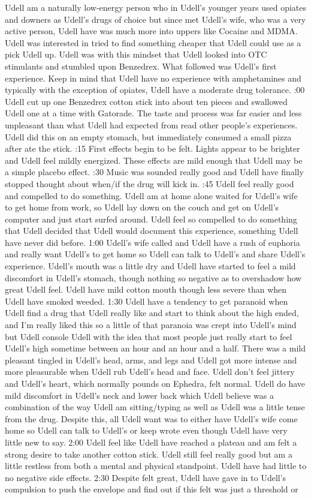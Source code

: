 \documentclass[12pt]{book}
\begin{document}
Udell am a naturally low-energy person who in Udell's younger years used opiates and downers as Udell's drugs of choice but since met Udell's wife, who was a very active person, Udell have was much more into uppers like Cocaine and MDMA. Udell was interested in tried to find something cheaper that Udell could use as a pick Udell up. Udell was with this mindset that Udell looked into OTC stimulants and stumbled upon Benzedrex. What followed was Udell's first experience. Keep in mind that Udell have no experience with amphetamines and typically with the exception of opiates, Udell have a moderate drug tolerance. :00 Udell cut up one Benzedrex cotton stick into about ten pieces and swallowed Udell one at a time with Gatorade. The taste and process was far easier and less unpleasant than what Udell had expected from read other people's experiences. Udell did this on an empty stomach, but immediately consumed a small pizza after ate the stick. :15 First effects begin to be felt. Lights appear to be brighter and Udell feel mildly energized. These effects are mild enough that Udell may be a simple placebo effect. :30 Music was sounded really good and Udell have finally stopped thought about when/if the drug will kick in. :45 Udell feel really good and compelled to do something. Udell am at home alone waited for Udell's wife to get home from work, so Udell lay down on the couch and get on Udell's computer and just start surfed around. Udell feel so compelled to do something that Udell decided that Udell would document this experience, something Udell have never did before. 1:00 Udell's wife called and Udell have a rush of euphoria and really want Udell's to get home so Udell can talk to Udell's and share Udell's experience. Udell's mouth was a little dry and Udell have started to feel a mild discomfort in Udell's stomach, though nothing so negative as to overshadow how great Udell feel. Udell have mild cotton mouth though less severe than when Udell have smoked weeded. 1:30 Udell have a tendency to get paranoid when Udell find a drug that Udell really like and start to think about the high ended, and I'm really liked this so a little of that paranoia was crept into Udell's mind but Udell console Udell with the idea that most people just really start to feel Udell's high sometime between an hour and an hour and a half. There was a mild pleasant tingled in Udell's head, arms, and legs and Udell got more intense and more pleasurable when Udell rub Udell's head and face. Udell don't feel jittery and Udell's heart, which normally pounds on Ephedra, felt normal. Udell do have mild discomfort in Udell's neck and lower back which Udell believe was a combination of the way Udell am sitting/typing as well as Udell was a little tense from the drug. Despite this, all Udell want was to either have Udell's wife come home so Udell can talk to Udell's or keep wrote even though Udell have very little new to say. 2:00 Udell feel like Udell have reached a plateau and am felt a strong desire to take another cotton stick. Udell still feel really good but am a little restless from both a mental and physical standpoint. Udell have had little to no negative side effects. 2:30 Despite felt great, Udell have gave in to Udell's compulsion to push the envelope and find out if this felt was just a threshold or 
\end{document}
